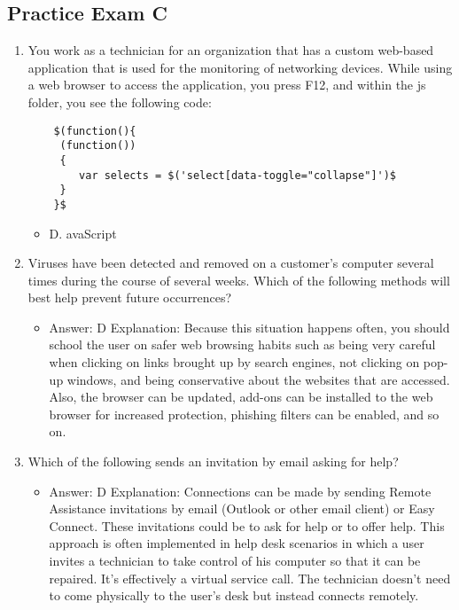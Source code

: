 \documentclass{article}
\begin{document}
\subsection{Practice Exam C}
\begin{enumerate}
    \item You work as a technician for an organization that has a custom web-based application that is used for the monitoring of networking devices. While using a web browser to access the application, you press F12, and 
    within the js folder, you see the following code: 
    \begin{lstlisting}
    $(function(){
     (function())
     {
        var selects = $('select[data-toggle="collapse"]')$
     }
    }$
    \end{lstlisting}
    \begin{itemize}
        \item D. avaScript
    \end{itemize}
    \item Viruses have been detected and removed on a customer's computer several times during the course of several weeks. Which of the following methods will best help prevent future occurrences? 
    \begin{itemize}
        \item Answer: D
Explanation: Because this situation happens often, you should school the user on safer
web browsing habits such as being very careful when clicking on links brought up by
search engines, not clicking on pop-up windows, and being conservative about the
websites that are accessed. Also, the browser can be updated, add-ons can be installed
to the web browser for increased protection, phishing filters can be enabled, and
so on.
    \end{itemize}
    \item Which of the following sends an invitation by email asking for
help?
    \begin{itemize}
        \item Answer: D
Explanation: Connections can be made by sending Remote Assistance invitations by
email (Outlook or other email client) or Easy Connect. These invitations could be to ask
for help or to offer help. This approach is often implemented in help desk scenarios
in which a user invites a technician to take control of his computer so that it can be
repaired. It’s effectively a virtual service call. The technician doesn’t need to come
physically to the user’s desk but instead connects remotely.
    \end{itemize}

\end{enumerate}
\end{document}
